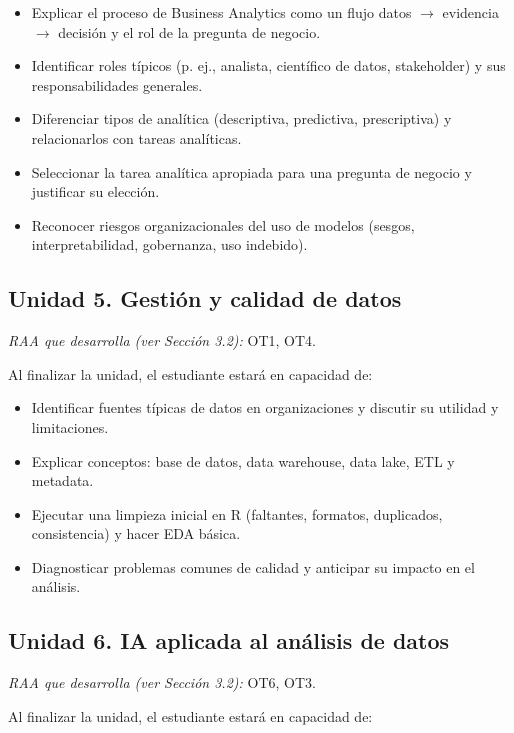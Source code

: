 \documentclass[11pt,a4paper]{article}
\begin{document}
\begin{itemize}
    \item Explicar el proceso de Business Analytics como un flujo datos $\rightarrow$ evidencia $\rightarrow$ decisión y el rol de la pregunta de negocio.
    \item Identificar roles típicos (p. ej., analista, científico de datos, stakeholder) y sus responsabilidades generales.
    \item Diferenciar tipos de analítica (descriptiva, predictiva, prescriptiva) y relacionarlos con tareas analíticas.
    \item Seleccionar la tarea analítica apropiada para una pregunta de negocio y justificar su elección.
    \item Reconocer riesgos organizacionales del uso de modelos (sesgos, interpretabilidad, gobernanza, uso indebido).
\end{itemize}

\subsection*{Unidad 5. Gestión y calidad de datos}

\textit{RAA que desarrolla (ver Sección 3.2):} OT1, OT4.

Al finalizar la unidad, el estudiante estará en capacidad de:

\begin{itemize}
    \item Identificar fuentes típicas de datos en organizaciones y discutir su utilidad y limitaciones.
    \item Explicar conceptos: base de datos, data warehouse, data lake, ETL y metadata.
    \item Ejecutar una limpieza inicial en R (faltantes, formatos, duplicados, consistencia) y hacer EDA básica.
    \item Diagnosticar problemas comunes de calidad y anticipar su impacto en el análisis.
\end{itemize}

\subsection*{Unidad 6. IA aplicada al análisis de datos}

\textit{RAA que desarrolla (ver Sección 3.2):} OT6, OT3.

Al finalizar la unidad, el estudiante estará en capacidad de:
\end{document}
